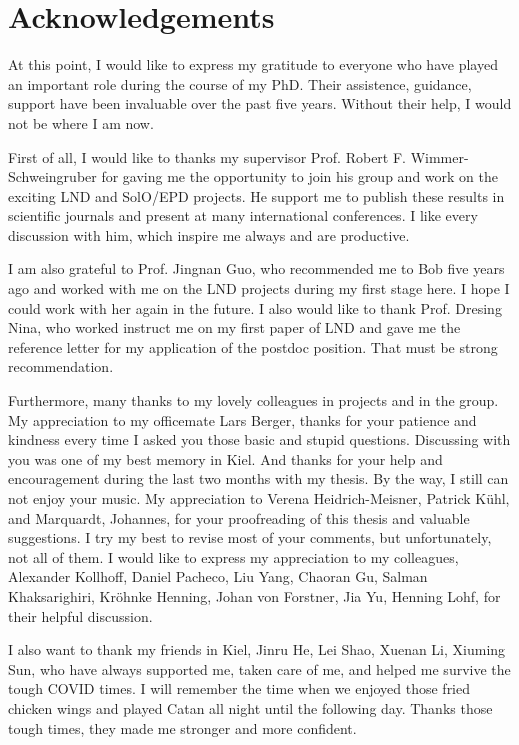 \chapter*{Acknowledgements}

At this point, I would like to express my gratitude to everyone who have played an important role during the course of my PhD. Their assistence, guidance, support have been invaluable over the past five years. Without their help, I would not be where I am now.

First of all, I would like to thanks my supervisor Prof. Robert F. Wimmer-Schweingruber for gaving me the opportunity to join his group and work on the exciting LND and SolO/EPD projects. He support me to publish these results in scientific journals and present at many international conferences. I like every discussion with him, which inspire me always and are productive.

I am also grateful to Prof. Jingnan Guo, who recommended me to Bob five years ago and worked with me on the LND projects during my first stage here. I hope I could work with her again in the future. I also would like to thank Prof. Dresing Nina, who worked instruct me on my first paper of LND and gave me the reference letter for my application of the postdoc position. That must be strong recommendation.

Furthermore, many thanks to my lovely colleagues in projects and in the group. My appreciation to my officemate Lars Berger, thanks for your patience and kindness every time I asked you those basic and stupid questions. Discussing with you was one of my best memory in Kiel. And thanks for your help and encouragement during the last two months with my thesis. By the way, I still can not enjoy your music. My appreciation to Verena Heidrich-Meisner, Patrick K\"{u}hl, and Marquardt, Johannes, for your proofreading of this thesis and valuable suggestions. I try my best to revise most of your comments, but unfortunately, not all of them. I would like to express my appreciation to my colleagues, Alexander Kollhoff, Daniel Pacheco, Liu Yang, Chaoran Gu, Salman Khaksarighiri, Kr\"{o}hnke Henning, Johan von Forstner, Jia Yu, Henning Lohf, for their helpful discussion.

I also want to thank my friends in Kiel, Jinru He, Lei Shao, Xuenan Li, Xiuming Sun, who have always supported me, taken care of me, and helped me survive the tough COVID times. I will remember the time when we enjoyed those fried chicken wings and played Catan all night until the following day. Thanks those tough times, they made me stronger and more confident.

